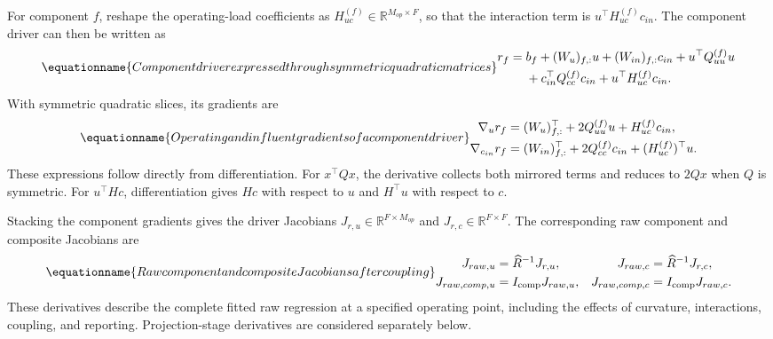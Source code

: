 For component \(f\), reshape the operating-load coefficients as \(H_{uc}^{(f)}\in\mathbb{R}^{M_{op}\times F}\), so that the interaction term is \(u^\top H_{uc}^{(f)}c_{in}\). The component driver can then be written as
\begin{equation}
\equationname{Component driver expressed through symmetric quadratic matrices}
\label{eq:icsor_driver_component}
\begin{aligned}
r_f={}&b_f+(W_u)_{f,:}u+(W_{in})_{f,:}c_{in}
+u^\top Q_{uu}^{(f)}u\\
&+c_{in}^\top Q_{cc}^{(f)}c_{in}
+u^\top H_{uc}^{(f)}c_{in}.
\end{aligned}
\end{equation}
With symmetric quadratic slices, its gradients are
\begin{equation}
\equationname{Operating and influent gradients of a component driver}
\label{eq:icsor_driver_gradients}
\begin{aligned}
\nabla_u r_f&=(W_u)_{f,:}^\top+2Q_{uu}^{(f)}u
+H_{uc}^{(f)}c_{in},\\
\nabla_{c_{in}}r_f&=(W_{in})_{f,:}^\top+2Q_{cc}^{(f)}c_{in}
+(H_{uc}^{(f)})^\top u.
\end{aligned}
\end{equation}
These expressions follow directly from differentiation. For \(x^\top Qx\), the derivative collects both mirrored terms and reduces to \(2Qx\) when \(Q\) is symmetric. For \(u^\top Hc\), differentiation gives \(Hc\) with respect to \(u\) and \(H^\top u\) with respect to \(c\).

Stacking the component gradients gives the driver Jacobians \(J_{r,u}\in\mathbb{R}^{F\times M_{op}}\) and \(J_{r,c}\in\mathbb{R}^{F\times F}\). The corresponding raw component and composite Jacobians are
\begin{equation}
\equationname{Raw component and composite Jacobians after coupling}
\label{eq:icsor_raw_jacobians}
\begin{aligned}
J_{raw,u}&=\widehat R^{-1}J_{r,u},
&J_{raw,c}&=\widehat R^{-1}J_{r,c},\\
J_{raw,comp,u}&=I_{\mathrm{comp}}J_{raw,u},
&J_{raw,comp,c}&=I_{\mathrm{comp}}J_{raw,c}.
\end{aligned}
\end{equation}
These derivatives describe the complete fitted raw regression at a specified operating point, including the effects of curvature, interactions, coupling, and reporting. Projection-stage derivatives are considered separately below.

